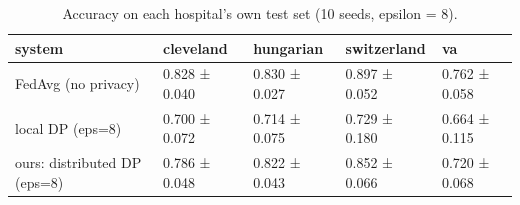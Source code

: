 \begin{table}
\caption{Accuracy on each hospital's own test set (10 seeds, epsilon = 8).}
\label{tab:T14_per_hospital_accuracy}
\begin{tabular}{lllll}
\toprule
system & cleveland & hungarian & switzerland & va \\
\midrule
FedAvg (no privacy) & 0.828 ± 0.040 & 0.830 ± 0.027 & 0.897 ± 0.052 & 0.762 ± 0.058 \\
local DP (eps=8) & 0.700 ± 0.072 & 0.714 ± 0.075 & 0.729 ± 0.180 & 0.664 ± 0.115 \\
ours: distributed DP (eps=8) & 0.786 ± 0.048 & 0.822 ± 0.043 & 0.852 ± 0.066 & 0.720 ± 0.068 \\
\bottomrule
\end{tabular}
\end{table}
